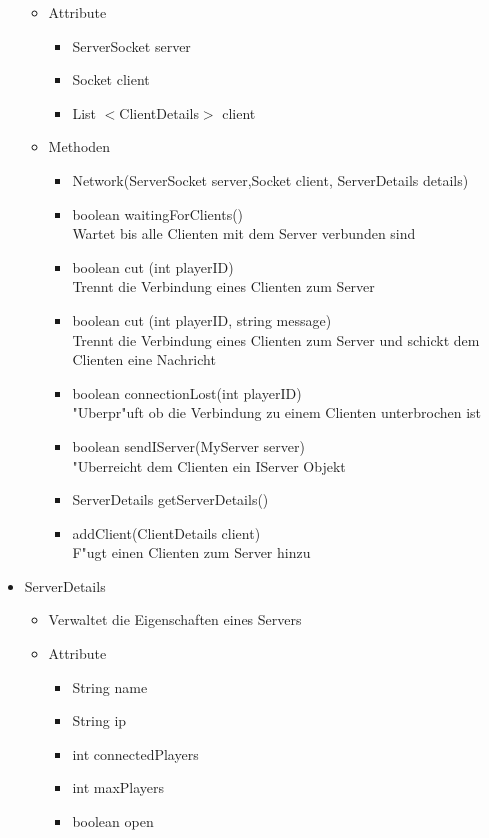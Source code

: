 \documentclass[a4paper,10pt]{article}
\begin{document}
\begin{itemize}
\begin {itemize}
\item Attribute
\begin{itemize}
\item ServerSocket server
\item Socket client
\item List $<$ClientDetails$>$ client
\end{itemize}
\item Methoden
\begin{itemize}
\item Network(ServerSocket server,Socket client, ServerDetails details) 
\item boolean waitingForClients()
\\Wartet bis alle Clienten mit dem Server verbunden sind
\item boolean cut (int playerID)
\\Trennt die Verbindung eines Clienten zum Server
\item boolean cut (int playerID, string message)
\\Trennt die Verbindung eines Clienten zum Server und schickt dem Clienten eine Nachricht
\item boolean connectionLost(int playerID)
\\"Uberpr"uft ob die Verbindung zu einem Clienten unterbrochen ist
\item boolean sendIServer(MyServer server)
\\"Uberreicht dem Clienten ein IServer Objekt
\item ServerDetails getServerDetails()
\item addClient(ClientDetails client)
\\F"ugt einen Clienten zum Server hinzu
\end{itemize}
\end{itemize}
\item ServerDetails
\begin{itemize}
\item Verwaltet die Eigenschaften eines Servers
\end{itemize}
\begin {itemize}
\item Attribute
\begin{itemize}
\item String name
\item String ip
\item int connectedPlayers
\item int maxPlayers
\item boolean open

\end{itemize}
\end{itemize}
\end{itemize}
\end{document}
